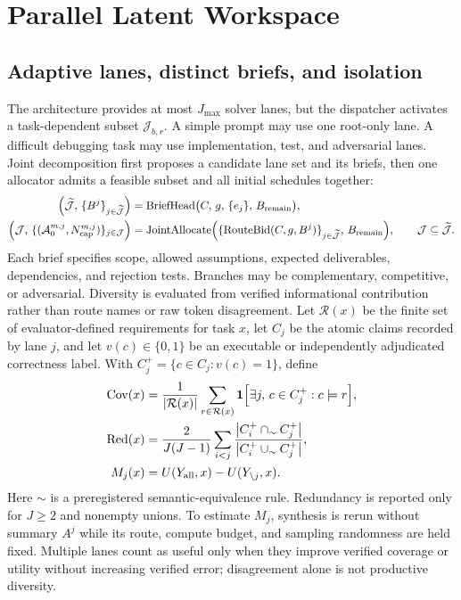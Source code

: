\documentclass[10pt,a4paper]{article}
\newcommand{\op}[1]{\operatorname{#1}}
\newcommand{\Acal}{\mathcal{A}}
\newcommand{\Jcal}{\mathcal{J}}
\newcommand{\Rcal}{\mathcal{R}}
\begin{document}
\section{Parallel Latent Workspace}
\label{sec:workspace}

\subsection{Adaptive lanes, distinct briefs, and isolation}

The architecture provides at most $J_{\max}$ solver lanes, but the dispatcher
activates a task-dependent subset $\Jcal_{b,r}$. A simple prompt may use one
root-only lane. A difficult debugging task may use implementation, test, and
adversarial lanes. Joint decomposition first proposes a candidate lane set and
its briefs, then one allocator admits a feasible subset and all initial
schedules together:
\begin{align}
\Bigl( \widetilde{\Jcal},\, \{B^j\}_{j \in \widetilde{\Jcal}} \Bigr)
  &= \op{BriefHead}\bigl( C,\, g,\, \{e_j\},\, B_{\mathrm{remain}} \bigr), \\
\Bigl( \Jcal,\, \{(\Acal^{m,j}_0, N^{m,j}_{\mathrm{cap}})\}_{j \in \Jcal} \Bigr)
  &= \op{JointAllocate}\Bigl( \{\op{RouteBid}(C, g, B^j)\}_{j \in \widetilde{\Jcal}},\,
  B_{\mathrm{remain}} \Bigr), \qquad \Jcal \subseteq \widetilde{\Jcal}.
\end{align}
Each brief specifies scope, allowed assumptions, expected deliverables,
dependencies, and rejection tests. Branches may be complementary, competitive,
or adversarial. Diversity is evaluated from verified informational contribution
rather than route names or raw token disagreement. Let $\Rcal(x)$ be the finite
set of evaluator-defined requirements for task $x$, let $C_j$ be the atomic
claims recorded by lane $j$, and let $v(c) \in \{0,1\}$ be an executable or
independently adjudicated correctness label. With
$C^+_j = \{c \in C_j : v(c) = 1\}$, define
\begin{align}
\op{Cov}(x) &= \frac{1}{|\Rcal(x)|} \sum_{r \in \Rcal(x)}
  \mathbf{1}\Bigl[ \exists j,\, c \in C^+_j : c \models r \Bigr], \\
\op{Red}(x) &= \frac{2}{J(J-1)} \sum_{i < j}
  \frac{\bigl| C^+_i \cap_{\sim} C^+_j \bigr|}{\bigl| C^+_i \cup_{\sim} C^+_j \bigr|}, \\
M_j(x) &= U(Y_{\mathrm{all}}, x) - U(Y_{\setminus j}, x).
\label{eq:marginal}
\end{align}
Here $\sim$ is a preregistered semantic-equivalence rule. Redundancy is
reported only for $J \ge 2$ and nonempty unions. To estimate $M_j$, synthesis
is rerun without summary $A^j$ while its route, compute budget, and sampling
randomness are held fixed. Multiple lanes count as useful only when they
improve verified coverage or utility without increasing verified error;
disagreement alone is not productive diversity.
\end{document}
